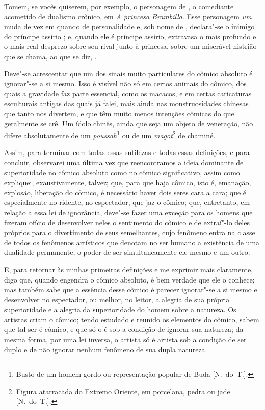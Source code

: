Tomem, se vocês quiserem, por exemplo, o personagem de , o
comediante acometido de dualismo crônico, em \textit{A princesa
Brambilla}. Esse personagem \textit{um }muda de vez em quando de
personalidade e, sob nome de , declara"-se o inimigo do
príncipe assírio ; e, quando ele é príncipe assírio,
extravasa o mais profundo e o mais real desprezo sobre seu rival junto
à princesa, sobre um miserável histrião que se chama, ao que se diz,
.

Deve"-se acrescentar que um dos sinais muito particulares do cômico
absoluto é ignorar"-se a si mesmo. Isso é visível não só em certos
animais do cômico, dos quais a gravidade faz parte essencial, como os
macacos, e em certas caricaturas esculturais antigas das quais já
falei, mais ainda nas monstruosidades chinesas que tanto nos divertem,
e que têm muito menos intenções cômicas do que geralmente se crê. Um
ídolo chinês, ainda que seja um objeto de veneração, não difere
absolutamente de um \textit{poussah}\footnote{ Busto de um homem gordo
ou representação popular de Buda [N.~do~T.].}\textit{ }ou de um		
\textit{magot}\footnote{ Figura atarracada do Extremo Oriente, em
porcelana, pedra ou jade [N.~do~T.].} de chaminé.

Assim, para terminar com todas essas sutilezas e todas essas definições,
e para concluir, observarei uma última vez que reencontramos a ideia
dominante de superioridade no cômico absoluto como no cômico
significativo, assim como expliquei, exaustivamente, talvez; que, para
que haja cômico, isto é, emanação, explosão, liberação do cômico, é
necessário haver dois seres cara a cara; que é especialmente no
ridente, no espectador, que jaz o cômico; que, entretanto, em relação a
essa lei de ignorância, deve"-se fazer uma exceção para os homens que
fizeram ofício de desenvolver neles o sentimento do cômico e de
extraí"-lo deles próprios para o divertimento de seus semelhantes, cujo
fenômeno entra na classe de todos os fenômenos artísticos que denotam
no ser humano a existência de uma dualidade permanente, o poder de ser
simultaneamente ele mesmo e um outro.

E, para retornar às minhas primeiras definições e me exprimir mais
claramente, digo que, quando  engendra o cômico absoluto, é bem
verdade que ele o conhece; mas também sabe que a essência desse cômico
é parecer ignorar"-se a si mesmo e desenvolver no espectador, ou melhor,
no leitor, a alegria de sua própria superioridade e a alegria da
superioridade do homem sobre a natureza. Os artistas criam o cômico;
tendo estudado e reunido os elementos do cômico, sabem que tal ser é
cômico, e que só o é sob a condição de ignorar sua natureza; da mesma
forma, por uma lei inversa, o artista só é artista sob a condição de
ser duplo e de não ignorar nenhum fenômeno de sua dupla natureza.


